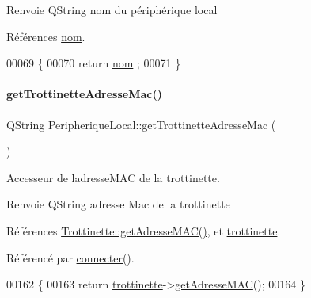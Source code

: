 \begin{DoxyReturn}{Renvoie}
Q\+String nom du périphérique local 
\end{DoxyReturn}


Références \hyperlink{class_peripherique_local_a16dcebf91bf74b8e3f1c2d90b77dda29}{nom}.


\begin{DoxyCode}
00069 \{
00070     \textcolor{keywordflow}{return} \hyperlink{class_peripherique_local_a16dcebf91bf74b8e3f1c2d90b77dda29}{nom} ;
00071 \}
\end{DoxyCode}
\mbox{\label{class_peripherique_local_a465658a204541e309f2647d473f658d8}} 
\paragraph{\texorpdfstring{get\+Trottinette\+Adresse\+Mac()}{getTrottinetteAdresseMac()}}
{\footnotesize\ttfamily Q\+String Peripherique\+Local\+::get\+Trottinette\+Adresse\+Mac (\begin{DoxyParamCaption}{ }\end{DoxyParamCaption})}

Accesseur de l\textquotesingle{}adresse\+M\+AC de la trottinette.

\begin{DoxyReturn}{Renvoie}
Q\+String adresse Mac de la trottinette 
\end{DoxyReturn}


Références \hyperlink{class_trottinette_a4d319bfda23b3d871b62e3e910cc204d}{Trottinette\+::get\+Adresse\+M\+A\+C()}, et \hyperlink{class_peripherique_local_aa110b2c3292270553f592362e45f710b}{trottinette}.



Référencé par \hyperlink{class_peripherique_local_af2e7f023f8ed72ebc1d36e66c440ceca}{connecter()}.


\begin{DoxyCode}
00162 \{
00163     \textcolor{keywordflow}{return} \hyperlink{class_peripherique_local_aa110b2c3292270553f592362e45f710b}{trottinette}->\hyperlink{class_trottinette_a4d319bfda23b3d871b62e3e910cc204d}{getAdresseMAC}();
00164 \}
\end{DoxyCode}
\mbox{\label{class_peripherique_local_ac81a942b4d1d9e848649073c53ed6917}} 

